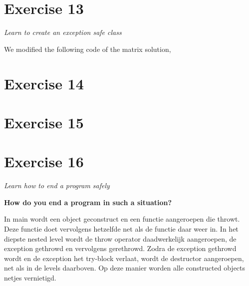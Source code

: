 \documentclass[12pt]{article}
\newcommand{\desc}[1]{\textit{#1} \vspace{1em}}
\begin{document}
\clearpage
\section*{Exercise 13}
\desc{Learn to create an exception safe class}

We modified the following code of the matrix solution,














\clearpage
\section*{Exercise 14}
\desc{}


\clearpage
\section*{Exercise 15}
\desc{}

\clearpage
\section*{Exercise 16}
\desc{Learn how to end a program safely}

\textbf{How do you end a program in such a situation?}

In main wordt een object geconstruct en een functie aangeroepen die throwt. Deze functie doet vervolgens hetzelfde net als de functie daar weer in. In het diepste nested level wordt de throw operator daadwerkelijk aangeroepen, de exception gethrowd en vervolgens gerethrowd. Zodra de exception gethrowd wordt en de exception het try-block verlaat, wordt de destructor aangeroepen, net als in de levels daarboven.
Op deze manier worden alle constructed objects netjes vernietigd.\\
\end{document}
